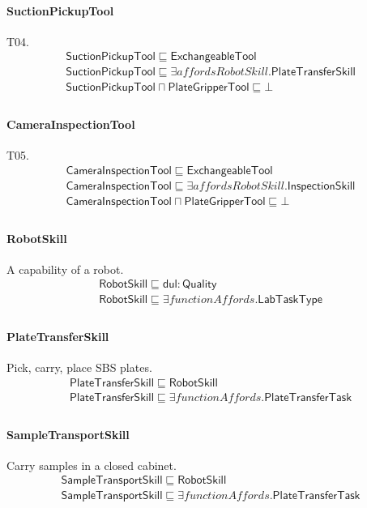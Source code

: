 \documentclass[10pt]{article}
\begin{document}
\paragraph{SuctionPickupTool} T04.
\[\begin{array}{l}
\mathsf{SuctionPickupTool} \sqsubseteq  \mathsf{ExchangeableTool} \\
\mathsf{SuctionPickupTool} \sqsubseteq  \exists \mathit{affordsRobotSkill}.\mathsf{PlateTransferSkill} \\
\mathsf{SuctionPickupTool} \sqcap  \mathsf{PlateGripperTool} \sqsubseteq  \bot  \\
\end{array}\]
\paragraph{CameraInspectionTool} T05.
\[\begin{array}{l}
\mathsf{CameraInspectionTool} \sqsubseteq  \mathsf{ExchangeableTool} \\
\mathsf{CameraInspectionTool} \sqsubseteq  \exists \mathit{affordsRobotSkill}.\mathsf{InspectionSkill} \\
\mathsf{CameraInspectionTool} \sqcap  \mathsf{PlateGripperTool} \sqsubseteq  \bot  \\
\end{array}\]
\paragraph{RobotSkill} A capability of a robot.
\[\begin{array}{l}
\mathsf{RobotSkill} \sqsubseteq  \mathsf{dul{:}Quality} \\
\mathsf{RobotSkill} \sqsubseteq  \exists \mathit{functionAffords}.\mathsf{LabTaskType} \\
\end{array}\]
\paragraph{PlateTransferSkill} Pick, carry, place SBS plates.
\[\begin{array}{l}
\mathsf{PlateTransferSkill} \sqsubseteq  \mathsf{RobotSkill} \\
\mathsf{PlateTransferSkill} \sqsubseteq  \exists \mathit{functionAffords}.\mathsf{PlateTransferTask} \\
\end{array}\]
\paragraph{SampleTransportSkill} Carry samples in a closed cabinet.
\[\begin{array}{l}
\mathsf{SampleTransportSkill} \sqsubseteq  \mathsf{RobotSkill} \\
\mathsf{SampleTransportSkill} \sqsubseteq  \exists \mathit{functionAffords}.\mathsf{PlateTransferTask} \\
\end{array}\]
\end{document}
